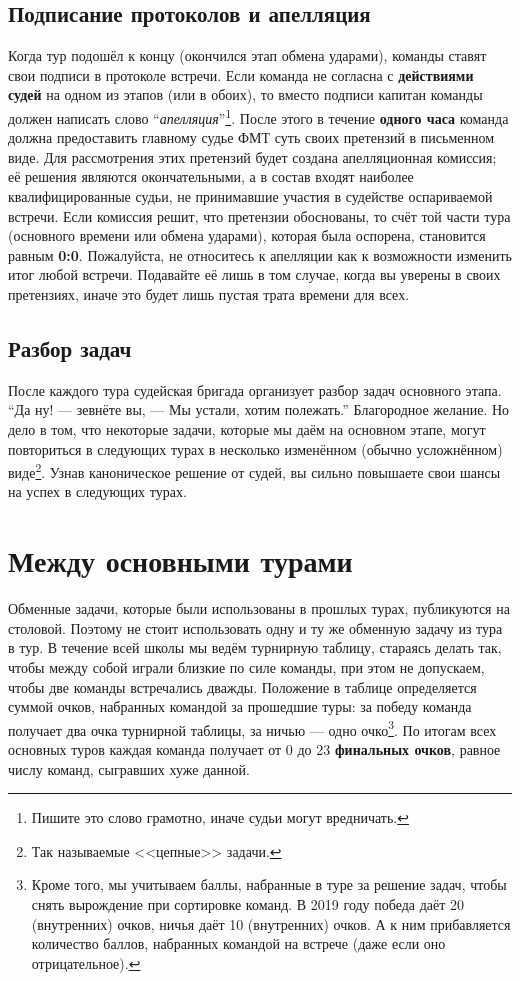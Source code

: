 \documentclass[12pt]{article}
\begin{document}
\subsection*{Подписание протоколов и апелляция}
Когда тур подошёл к концу (окончился этап обмена ударами), команды ставят свои подписи в протоколе встречи. Если команда не согласна с {\bf действиями судей} на одном из этапов (или в обоих), то вместо подписи капитан команды должен написать слово ``\textsl{апелляция}''\footnote{Пишите это слово грамотно, иначе судьи могут вредничать.}. После этого в течение {\bf одного часа} команда должна предоставить главному судье ФМТ суть своих претензий в письменном виде. Для рассмотрения этих претензий будет создана апелляционная комиссия; её решения являются окончательными, а в состав входят наиболее квалифицированные судьи, не принимавшие участия в судействе оспариваемой встречи. Если комиссия решит, что претензии обоснованы, то счёт той части тура (основного времени или обмена ударами), которая была оспорена, становится равным \textbf{0:0}. Пожалуйста, не относитесь к апелляции как к возможности изменить итог любой встречи. Подавайте её лишь в том случае, когда вы уверены в своих претензиях, иначе это будет лишь пустая трата времени для всех.

\subsection*{Разбор задач}
После каждого тура судейская бригада организует разбор задач основного этапа. ``Да ну! --- зевнёте вы, --- Мы устали, хотим полежать.'' Благородное желание. Но дело в том, что некоторые задачи, которые мы даём на основном этапе, могут повториться в следующих турах в несколько изменённом (обычно усложнённом) виде\footnote{Так называемые <<цепные>> задачи.}. Узнав каноническое решение от судей, вы сильно повышаете свои шансы на успех в следующих турах.

\section*{Между основными турами}
Обменные задачи, которые были использованы в прошлых турах, публикуются на столовой. Поэтому не стоит использовать одну и ту же обменную задачу из тура в тур. В течение всей школы мы ведём турнирную таблицу, стараясь делать так, чтобы между собой играли близкие по силе команды, при этом не допускаем, чтобы две команды встречались дважды. Положение в таблице определяется суммой очков, набранных командой за прошедшие туры: за победу команда получает два очка турнирной таблицы, за ничью --- одно очко\footnote{Кроме того, мы учитываем баллы, набранные в туре за решение задач, чтобы снять вырождение при сортировке команд. В 2019 году победа даёт 20 (внутренних) очков, ничья даёт 10 (внутренних) очков. А к ним прибавляется количество баллов, набранных командой на встрече (даже если оно отрицательное).}. По итогам всех основных туров каждая команда получает от 0 до 23 {\bf финальных очков}, равное числу команд, сыгравших хуже данной.
\end{document}
